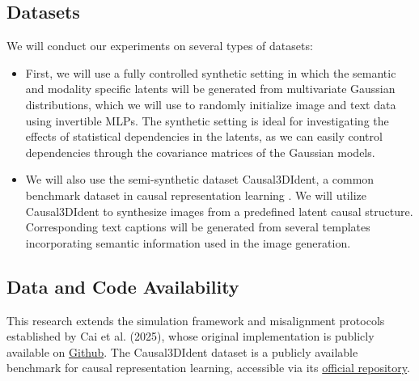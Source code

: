 \documentclass[a4paper,12pt]{article}
\begin{document}
\subsection*{Datasets}

We will conduct our experiments on several types of datasets:
\begin{itemize}
  \item First, we will use a fully controlled synthetic setting in which the semantic and modality specific latents will be generated from multivariate Gaussian distributions, which we will use to randomly initialize image and text data using invertible MLPs. The synthetic setting is ideal for investigating the effects of statistical dependencies in the latents, as we can easily control dependencies through the covariance matrices of the Gaussian models. 
  \item We will also use the semi-synthetic dataset Causal3DIdent, a common benchmark dataset in causal representation learning \cite{julius_von_kugelgen_2021_4784282}. We will utilize Causal3DIdent to synthesize images from a predefined latent causal structure. Corresponding text captions will be generated from several templates incorporating semantic information used in the image generation.
\end{itemize}

\subsection*{Data and Code Availability}
This research extends the simulation framework and misalignment protocols established by Cai et al. (2025), whose original implementation is publicly available on \href{https://github.com/YichaoCai1/crossmodal_misalignment/tree/main}{Github}. The Causal3DIdent dataset is a publicly available benchmark for causal representation learning, accessible via its \href{https://zenodo.org/records/4784282#.YgWo0PXMKbg}{official repository}.

\newpage


\end{document}
